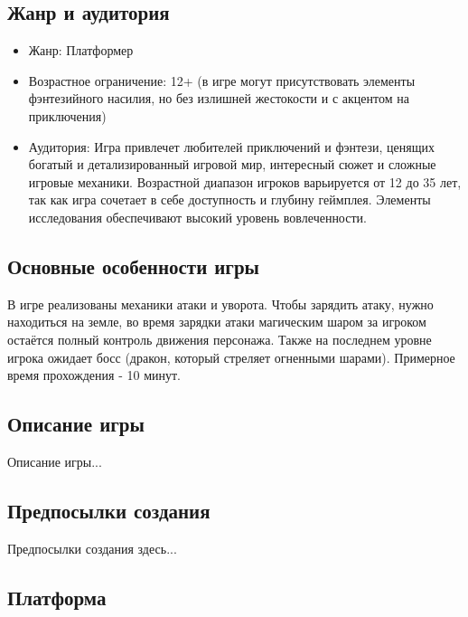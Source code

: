 \documentclass{article}
\begin{document}
\subsection{Жанр и аудитория}
\begin{itemize}
    \item Жанр: 
    Платформер
    \item Возрастное ограничение:
    12+ (в игре могут присутствовать элементы фэнтезийного насилия, но без излишней жестокости и с акцентом на приключения)
    \item Аудитория:
    Игра привлечет любителей приключений и фэнтези, ценящих богатый и детализированный игровой мир, интересный сюжет и сложные игровые механики. Возрастной диапазон игроков варьируется от 12 до 35 лет, так как игра сочетает в себе доступность и глубину геймплея. Элементы исследования обеспечивают высокий уровень вовлеченности.
\end{itemize}

\subsection{Основные особенности игры}
В игре реализованы механики атаки и уворота. Чтобы зарядить атаку, нужно находиться на земле, во время зарядки атаки магическим шаром за игроком остаётся полный контроль движения персонажа. Также на последнем уровне игрока ожидает босс (дракон, который стреляет огненными шарами).
Примерное время прохождения - 10 минут.

\subsection{Описание игры}
Описание игры...

\subsection{Предпосылки создания}
 Предпосылки создания здесь...
\subsection{Платформа}
\end{document}
